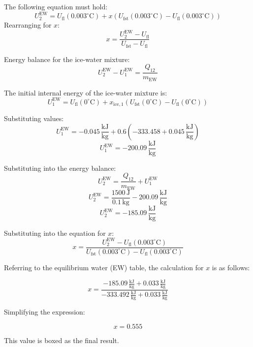 The following equation must hold:  
\[
U_2^{\text{EW}} = U_{\text{fl}}(0.003^\circ\text{C}) + x \left( U_{\text{fst}}(0.003^\circ\text{C}) - U_{\text{fl}}(0.003^\circ\text{C}) \right)
\]  
Rearranging for \( x \):  
\[
x = \frac{U_2^{\text{EW}} - U_{\text{fl}}}{U_{\text{fst}} - U_{\text{fl}}}
\]  

Energy balance for the ice-water mixture:  
\[
U_2^{\text{EW}} - U_1^{\text{EW}} = \frac{Q_{12}}{m_{\text{EW}}}
\]  

The initial internal energy of the ice-water mixture is:  
\[
U_1^{\text{EW}} = U_{\text{fl}}(0^\circ\text{C}) + x_{\text{ice},1} \left( U_{\text{fst}}(0^\circ\text{C}) - U_{\text{fl}}(0^\circ\text{C}) \right)
\]  

Substituting values:  
\[
U_1^{\text{EW}} = -0.045 \, \frac{\text{kJ}}{\text{kg}} + 0.6 \left( -333.458 + 0.045 \, \frac{\text{kJ}}{\text{kg}} \right)
\]  
\[
U_1^{\text{EW}} = -200.09 \, \frac{\text{kJ}}{\text{kg}}
\]  

Substituting into the energy balance:  
\[
U_2^{\text{EW}} = \frac{Q_{12}}{m_{\text{EW}}} + U_1^{\text{EW}}
\]  
\[
U_2^{\text{EW}} = \frac{1500 \, \text{J}}{0.1 \, \text{kg}} - 200.09 \, \frac{\text{kJ}}{\text{kg}}
\]  
\[
U_2^{\text{EW}} = -185.09 \, \frac{\text{kJ}}{\text{kg}}
\]  

Substituting into the equation for \( x \):  
\[
x = \frac{U_2^{\text{EW}} - U_{\text{fl}}(0.003^\circ\text{C})}{U_{\text{fst}}(0.003^\circ\text{C}) - U_{\text{fl}}(0.003^\circ\text{C})}
\]

Referring to the equilibrium water (EW) table, the calculation for \( x \) is as follows:

\[
x = \frac{-185.09 \, \frac{\text{kJ}}{\text{kg}} + 0.033 \, \frac{\text{kJ}}{\text{kg}}}{-333.492 \, \frac{\text{kJ}}{\text{kg}} + 0.033 \, \frac{\text{kJ}}{\text{kg}}}
\]

Simplifying the expression:

\[
x = 0.555
\]

This value is boxed as the final result.